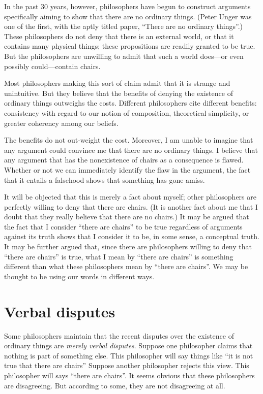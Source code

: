 \documentclass[11pt]{article}
\begin{document}
\begin{spacing}{1.25}
In the past 30 years, however, philosophers have begun to construct
arguments specifically aiming to show that there are no ordinary
things.  (Peter Unger was one of the first, with the aptly titled
paper, ``There are no ordinary things''.)  These philosophers do not
deny that there is an external world, or that it contains many
physical things; these propositions are readily granted to be true.
But the philosophers are unwilling to admit that such a world
does---or even possibly could---contain chairs.

Most philosophers making this sort of claim admit that it is strange
and unintuitive.  But they believe that the benefits of denying the
existence of ordinary things outweighs the costs.  Different
philosophers cite different benefits: consistency with regard to our
notion of composition, theoretical simplicity, or greater coherency
among our beliefs.  

The benefits do not out-weight the cost.  Moreover, I am unable to
imagine that any argument could convince me that there are no ordinary
things.  I believe that any argument that has the nonexistence of
chairs as a consequence is flawed.  Whether or not we can immediately
identify the flaw in the argument, the fact that it entails a
falsehood shows that something has gone amiss.

It will be objected that this is merely a fact about myself; other
philosophers are perfectly willing to deny that there are chairs.  (It
is another fact about me that I doubt that they really believe that
there are no chairs.)  It may be argued that the fact that I consider
``there are chairs'' to be true regardless of arguments against its
truth shows that I consider it to be, in some sense, a conceptual
truth.  It may be further argued that, since there are philosophers
willing to deny that ``there are chairs'' is true, what I mean by
``there are chairs'' is something different than what these
philosophers mean by ``there are chairs''.  We may be thought to be
using our words in different ways.

\section{Verbal disputes}
\label{english}
Some philosophers maintain that the recent disputes over the existence
of ordinary things are {\em merely verbal disputes}.  Suppose one
philosopher claims that nothing is part of something else.  This
philosopher will say things like ``it is not true that there are
chairs'' Suppose another philosopher rejects this view.  This
philosopher will says ``there are chairs''.  It seems obvious that
these philosophers are disagreeing.  But according to some, they are
not disagreeing at all.  


\end{spacing}
\end{document}
